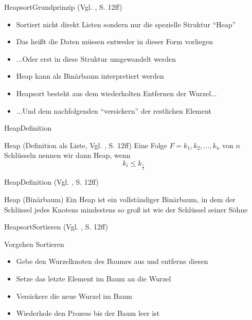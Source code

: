\begin{frame}{Heapsort}{Grundprinzip (Vgl. \cite{fahr:algo}, S. 12ff)}
    \begin{itemize}
        \item Sortiert nicht direkt Listen sondern nur die spezielle Struktur "`Heap"'
        \item Das heißt die Daten müssen entweder in dieser Form vorliegen
        \item ...Oder erst in diese Struktur umgewandelt werden
        \item Heap kann als Binärbaum interpretiert werden
        \item Heapsort besteht aus dem wiederholten Entfernen der Wurzel...
        \item ...Und dem nachfolgenden "`versickern"' der restlichen Element
    \end{itemize}
\end{frame}

\begin{frame}{Heap}{Definition}
    \begin{alertblock}{Heap (Definition als Liste, Vgl. \cite{fahr:algo}, S. 12ff)}
    Eine Folge $F = k_1, k_2, \ldots,k_n$ von $n$ Schlüsseln nennen wir dann Heap, wenn
    $$k_i\le k_{\frac{i}{2}}$$
    \end{alertblock}
\end{frame}

\begin{frame}{Heap}{Definition (Vgl. \cite{fahr:algo}, S. 12ff)}
    \begin{alertblock}{Heap (Binärbaum)}
    Ein Heap ist ein vollständiger Binärbaum, in dem der Schlüssel jedes Knotens mindestens so groß ist wie der Schlüssel seiner Söhne
    \end{alertblock}
\end{frame}

\begin{frame}{Heapsort}{Sortieren (Vgl. \cite{fahr:algo}, S. 12ff)}
\begin{alertblock}{Vorgehen Sortieren}
\begin{itemize}
    \item Gebe den Wurzelknoten des Baumes aus und entferne diesen
    \item Setze das letzte Element im Baum an die Wurzel
    \item Versickere die neue Wurzel im Baum
    \item Wiederhole den Prozess bis der Baum leer ist
\end{itemize}
\end{alertblock}
\end{frame}

